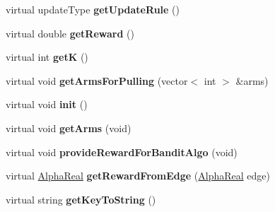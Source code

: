 \begin{DoxyCompactItemize}
\item 
\hypertarget{classMultiBoost_1_1BanditLearner_a267fc0298c1e9b251fae6fd7baf07519}{
virtual updateType {\bfseries getUpdateRule} ()}
\label{classMultiBoost_1_1BanditLearner_a267fc0298c1e9b251fae6fd7baf07519}

\item 
\hypertarget{classMultiBoost_1_1BanditLearner_a494dc0d3550838ed4ca8d70b335151c3}{
virtual double {\bfseries getReward} ()}
\label{classMultiBoost_1_1BanditLearner_a494dc0d3550838ed4ca8d70b335151c3}

\item 
\hypertarget{classMultiBoost_1_1BanditLearner_aa04428570d0846dbaaa72c8572096776}{
virtual int {\bfseries getK} ()}
\label{classMultiBoost_1_1BanditLearner_aa04428570d0846dbaaa72c8572096776}

\item 
\hypertarget{classMultiBoost_1_1BanditLearner_a719f7896f475a9780567e43e7f4833ed}{
virtual void {\bfseries getArmsForPulling} (vector$<$ int $>$ \&arms)}
\label{classMultiBoost_1_1BanditLearner_a719f7896f475a9780567e43e7f4833ed}

\item 
\hypertarget{classMultiBoost_1_1BanditLearner_a2c2dc2618028ddb8ddaa63787a16f91c}{
virtual void {\bfseries init} ()}
\label{classMultiBoost_1_1BanditLearner_a2c2dc2618028ddb8ddaa63787a16f91c}

\item 
\hypertarget{classMultiBoost_1_1BanditLearner_aa0b79c6c4226b1e988651e223075df57}{
virtual void {\bfseries getArms} (void)}
\label{classMultiBoost_1_1BanditLearner_aa0b79c6c4226b1e988651e223075df57}

\item 
\hypertarget{classMultiBoost_1_1BanditLearner_aaeec502a082d31ae48db6de28496bec8}{
virtual void {\bfseries provideRewardForBanditAlgo} (void)}
\label{classMultiBoost_1_1BanditLearner_aaeec502a082d31ae48db6de28496bec8}

\item 
\hypertarget{classMultiBoost_1_1BanditLearner_a3a60e5bbac2c9b330e6ea10ede2f1dab}{
virtual \hyperlink{Defaults_8h_a80184c4fd10ab70a1a17c5f97dcd1563}{AlphaReal} {\bfseries getRewardFromEdge} (\hyperlink{Defaults_8h_a80184c4fd10ab70a1a17c5f97dcd1563}{AlphaReal} edge)}
\label{classMultiBoost_1_1BanditLearner_a3a60e5bbac2c9b330e6ea10ede2f1dab}

\item 
\hypertarget{classMultiBoost_1_1BanditLearner_a10a31c2552eec473722e608dcdb289a7}{
virtual string {\bfseries getKeyToString} ()}
\label{classMultiBoost_1_1BanditLearner_a10a31c2552eec473722e608dcdb289a7}

\end{DoxyCompactItemize}
